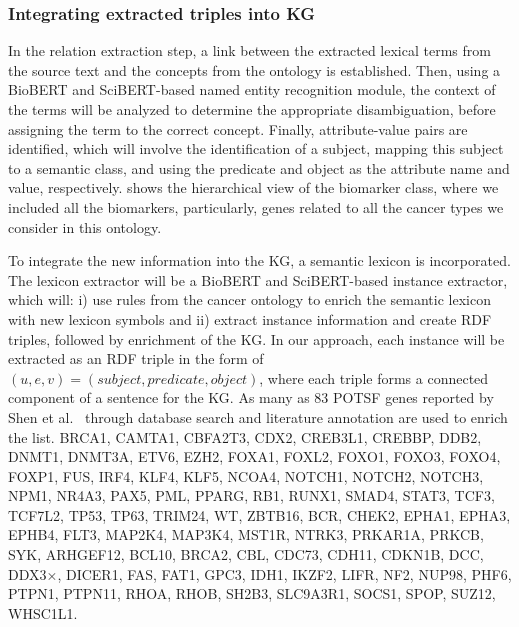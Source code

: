 \subsubsection{Integrating extracted triples into KG}
In the relation extraction step, a link between the extracted lexical terms from the source text and the concepts from the ontology is established. Then, using a BioBERT and SciBERT-based named entity recognition module, the context of the terms will be analyzed to determine the appropriate disambiguation, before assigning the term to the correct concept. Finally, attribute-value pairs are identified, which will involve the identification of a subject, mapping this subject to a semantic class, and using the predicate and object as the attribute name and value, respectively.  shows the hierarchical view of the biomarker class, where we included all the biomarkers, particularly, genes related to all the cancer types we consider in this ontology. 

\hspace*{3.5mm} To integrate the new information into the KG, a semantic lexicon is incorporated. The lexicon extractor will be a BioBERT and SciBERT-based instance extractor, which will: i) use rules from the cancer ontology to enrich the semantic lexicon with new lexicon symbols and ii) extract instance information and create RDF triples, followed by enrichment of the KG. In our approach, each instance will be extracted as an RDF triple in the form of $(u,e,v)=(\mathit{subject},\mathit{predicate},\mathit{object})$, where each triple forms a connected component of a sentence for the KG. As many as 83 POTSF genes reported by Shen et al.~\cite{POSTF} through database search and literature annotation are used to enrich the list. 
BRCA1, CAMTA1, CBFA2T3, CDX2, CREB3L1, CREBBP, DDB2, DNMT1, DNMT3A, ETV6, EZH2, FOXA1, FOXL2, FOXO1, FOXO3, FOXO4, FOXP1, FUS, IRF4, KLF4, KLF5, NCOA4, NOTCH1, NOTCH2, NOTCH3, NPM1, NR4A3, PAX5, PML, PPARG, RB1, RUNX1, SMAD4, STAT3, TCF3, TCF7L2, TP53, TP63, TRIM24, WT, ZBTB16, BCR, CHEK2, EPHA1, EPHA3, EPHB4, FLT3, MAP2K4, MAP3K4, MST1R, NTRK3, PRKAR1A, PRKCB, SYK, ARHGEF12, BCL10, BRCA2, CBL, CDC73, CDH11, CDKN1B, DCC, DDX3×, DICER1, FAS, FAT1, GPC3, IDH1, IKZF2, LIFR, NF2, NUP98, PHF6, PTPN1, PTPN11, RHOA, RHOB, SH2B3, SLC9A3R1, SOCS1, SPOP, SUZ12, WHSC1L1. 


